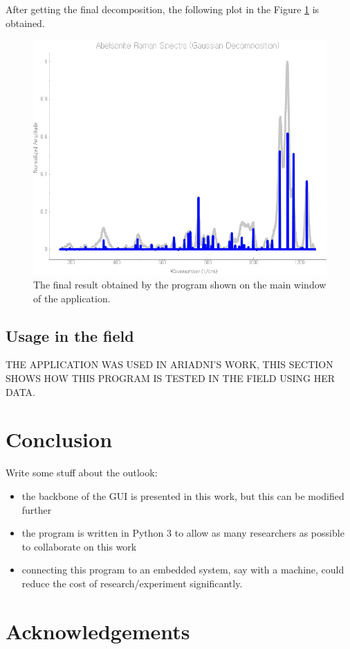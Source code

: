 \documentclass{article}
\begin{document}
After getting the final decomposition, the following plot in the Figure \ref{fig:abelsonite_final} is obtained.

\begin{figure}
    \centering
    \includegraphics[width=\linewidth]{final_abelsonite.png}
    \caption{The final result obtained by the program shown on the main window of the application.}
    \label{fig:abelsonite_final}
\end{figure}

%
%   
%
\subsection{Usage in the field}
THE APPLICATION WAS USED IN ARIADNI'S WORK, THIS SECTION SHOWS HOW THIS PROGRAM IS TESTED IN THE FIELD USING HER DATA.

%
%
\section{Conclusion}

Write some stuff about the outlook:
\begin{itemize}
    \item the backbone of the GUI is presented in this work, but this can be modified further
    \item the program is written in Python 3 to allow as many researchers as possible to collaborate on this work
    \item connecting this program to an embedded system, say with a machine, could reduce the cost of research/experiment significantly.
\end{itemize}

%
%
\section*{Acknowledgements}


 
\end{document}
